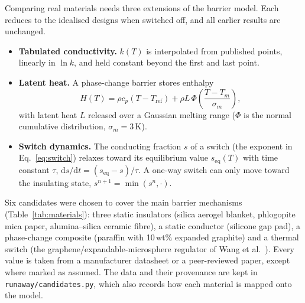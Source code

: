 \documentclass[11pt]{article}
\newcommand{\dd}{\mathrm{d}}
\begin{document}
Comparing real materials needs three extensions of the barrier model. Each reduces to the
idealised designs when switched off, and all earlier results are unchanged.
\begin{itemize}
  \item \textbf{Tabulated conductivity.} $k(T)$ is interpolated from published points,
        linearly in $\ln k$, and held constant beyond the first and last point.
  \item \textbf{Latent heat.} A phase-change barrier stores enthalpy
        \begin{equation}
          H(T) = \rho c_p (T - T_\mathrm{ref}) + \rho L\,\Phi\!\left(\frac{T - T_m}{\sigma_m}\right),
          \label{eq:enthalpy}
        \end{equation}
        with latent heat $L$ released over a Gaussian melting range ($\Phi$ is the normal
        cumulative distribution, $\sigma_m = 3$\,K).
  \item \textbf{Switch dynamics.} The conducting fraction $s$ of a switch (the exponent
        in Eq.~\eqref{eq:switch}) relaxes toward its equilibrium value $s_\mathrm{eq}(T)$
        with time constant $\tau$, $\dd s/\dd t = (s_\mathrm{eq} - s)/\tau$. A one-way
        switch can only move toward the insulating state, $s^{n+1} = \min(s^n, \cdot)$.
\end{itemize}
Six candidates were chosen to cover the main barrier mechanisms
(Table~\ref{tab:materials}): three static insulators (silica aerogel blanket, phlogopite
mica paper, alumina--silica ceramic fibre), a static conductor (silicone gap pad), a
phase-change composite (paraffin with 10\,wt\% expanded graphite) and a thermal switch
(the graphene/expandable-microsphere regulator of Wang et al.~\cite{wang2024regulator}).
Every value is taken from a manufacturer datasheet or a peer-reviewed paper, except
where marked as assumed. The data and their provenance are kept in
\texttt{runaway/candidates.py}, which also records how each material is mapped onto the
model.
\end{document}
